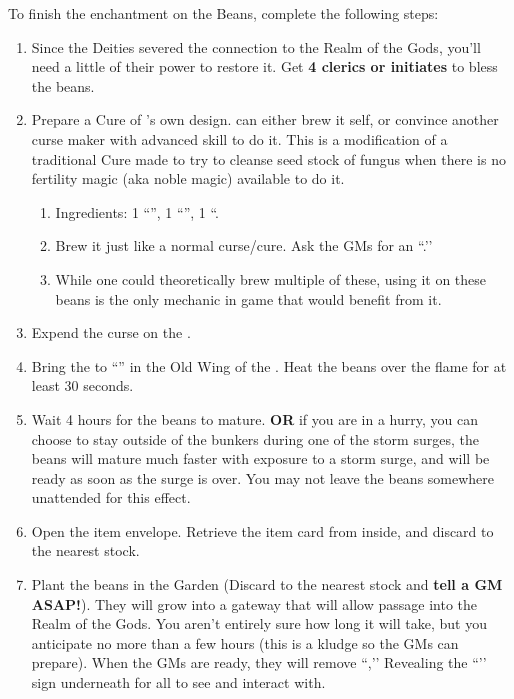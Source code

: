 \documentclass[green]{GL2020}
\begin{document}
To finish the enchantment on the Beans, complete the following steps:
\begin{enumerate}
  \item Since the Deities severed the connection to the Realm of the Gods, you’ll need a little of their power to restore it. Get \textbf{4 clerics or initiates} to bless the beans. 
  \item Prepare a Cure of \cCurse{}’s own design. \cCurse{} can either brew it \cCurse{\them}self, or convince another curse maker with advanced skill to do it. This is a modification of a traditional Cure made to try to cleanse seed stock of fungus when there is no fertility magic (aka noble magic) available to do it.
  \begin{enumerate}
    \item Ingredients: 1 ``\iHollyhock{}'', 1 ``\iFish{}'', 1 ``\iClay{}.
    \item Brew it just like a normal curse/cure. Ask the GMs for an ``\iEyeOfVulture{}.’’ 
    \item While one could theoretically brew multiple of these, using it on these beans is the only mechanic in game that would benefit from it.
  \end{enumerate}
  \item Expend the curse on the \iBeansNB{}.
  \item Bring the \iBeansNB{} to ``\sPFlameOne{}'' in the Old Wing of the \pSc{}. Heat the beans over the flame for at least 30 seconds.
  \item Wait 4 hours for the beans to mature. \textbf{OR} if you are in a hurry, you can choose to stay outside of the bunkers during one of the storm surges, the beans will mature much faster with exposure to a storm surge, and will be ready as soon as the surge is over. You may not leave the beans somewhere unattended for this effect.
  \item Open the \iBeansNB{} item envelope. Retrieve the \iBeansMB{} item card from inside, and discard \iBeansNB{} to the nearest stock.
  \item Plant the beans in the Garden (Discard \iBeansMB{} to the nearest stock and \textbf{tell a GM ASAP!}). They will grow into a gateway that will allow passage into the Realm of the Gods. You aren’t entirely sure how long it will take, but you anticipate no more than a few hours (this is a kludge so the GMs can prepare). When the GMs are ready, they will remove ``\sSignB{},’’ Revealing the ``\sMagicPortal{}’’ sign underneath for all to see and interact with.
\end{enumerate}
\end{document}
